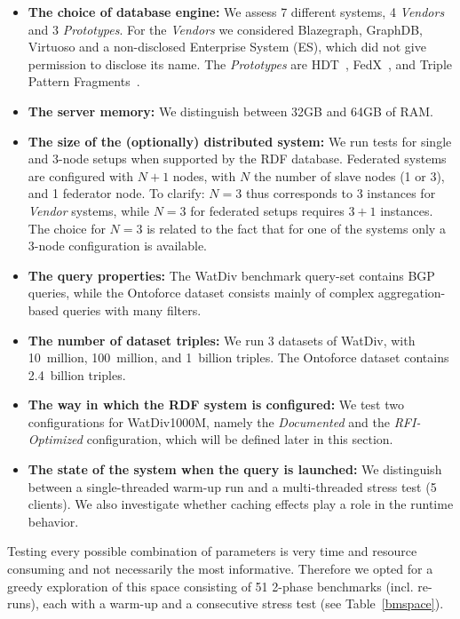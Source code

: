 \documentclass[twocolumn]{bmcart}%
\begin{document}
\begin{itemize}
	\item \textbf{The choice of database engine:} We assess 7 different systems, 4 \emph{Vendors} and 3 \emph{Prototypes}. For the \emph{Vendors} we considered Blazegraph, GraphDB, Virtuoso and a non-disclosed Enterprise System (ES), which did not give permission to disclose its name. The \emph{Prototypes} are HDT~\cite{DBLP:journals/ws/FernandezMGPA13}, FedX~\cite{DBLP:conf/semweb/SchwarteHHSS11}, and Triple Pattern Fragments~\cite{DBLP:conf/semweb/VerborghHMHVSCCMW14}.
	\item \textbf{The server memory:} We distinguish between 32GB and 64GB of RAM.
	\item \textbf{The size of the (optionally) distributed system:} We run tests for single and 3-node setups when supported by the RDF database. Federated systems are configured with $N+1$ nodes, with $N$ the number of slave nodes (1 or 3), and 1 federator node. To clarify: $N=3$ thus corresponds to 3 instances for \emph{Vendor} systems, while $N=3$ for federated setups requires $3+1$ instances. The choice for $N=3$ is related to the fact that for one of the systems only a 3-node configuration is available.
	\item \textbf{The query properties:} The WatDiv benchmark query-set contains BGP queries, while the Ontoforce dataset consists mainly of complex aggregation-based queries with many filters.
	\item \textbf{The number of dataset triples:} We run 3 datasets of WatDiv, with 10~million, 100~million, and 1~billion triples. The Ontoforce dataset contains 2.4~billion triples.
	\item \textbf{The way in which the RDF system is configured:} We test two configurations for WatDiv1000M, namely the \emph{Documented} and the \emph{RFI-Optimized} configuration, which will be defined later in this section. 
	\item \textbf{The state of the system when the query is launched:} We distinguish between a single-threaded warm-up run and a multi-threaded stress test (5 clients). We also investigate whether caching effects play a role in the runtime behavior.
\end{itemize} 

Testing every possible combination of parameters is very time and resource consuming and not necessarily the most informative. Therefore we opted for a greedy exploration of this space consisting of 51 2-phase  benchmarks (incl. re-runs), each with a warm-up and a consecutive stress test (see Table~\ref{bmspace}).
\end{document}
